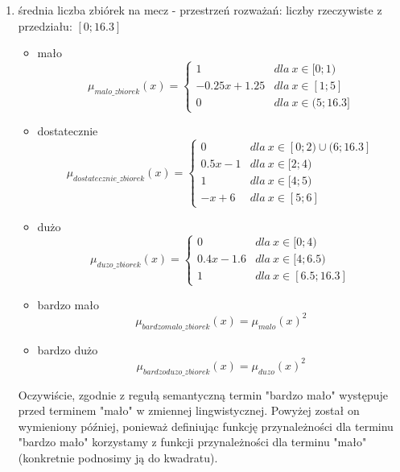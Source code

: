 \documentclass{classrep}
\begin{document}
\begin{enumerate}
    \item średnia liczba zbiórek na mecz - przestrzeń rozważań: liczby rzeczywiste z przedziału: $[0;16.3]$
    \begin{itemize}
        \item mało
        \begin{equation}
            \mu_{malo\_zbiorek}(x) = \left\{\begin{matrix} 1 & dla \: x\in[0;1) \\ -0.25x + 1.25 & dla \: x\in [1; 5] \\ 0 & dla \: x\in (5;16.3] \end{matrix}\right.
        \end{equation}
         \item dostatecznie
        \begin{equation}
            \mu_{dostatecznie\_zbiorek}(x) = \left\{\begin{matrix}0 & dla \: x\in [0;2) \cup (6;16.3] \\ 0.5x - 1 & dla \: x\in[2;4) \\ 1 & dla \: x\in [4; 5) \\ -x + 6 & dla \: x\in [5;6] \end{matrix}\right.
        \end{equation}
        \item dużo
        \begin{equation}
            \mu_{duzo\_zbiorek}(x) = \left\{\begin{matrix} 0 & dla \: x\in [0;4) \\ 0.4x - 1.6 & dla \: x\in[4;6.5) \\ 1 & dla \: x\in [6.5; 16.3] \end{matrix}\right.
        \end{equation}
        \item bardzo mało
        \begin{equation}
            \mu_{bardzomalo\_zbiorek}(x) = \mu_{malo}(x)^2
        \end{equation}
        \item bardzo dużo
        \begin{equation}
            \mu_{bardzoduzo\_zbiorek}(x) = \mu_{duzo}(x)^2
        \end{equation}
    \end{itemize}
    Oczywiście, zgodnie z regułą semantyczną termin "bardzo mało" występuje przed terminem "mało" w zmiennej lingwistycznej. Powyżej został on wymieniony później, ponieważ definiując funkcję przynależności dla terminu "bardzo mało" korzystamy z funkcji przynależności dla terminu "mało" (konkretnie podnosimy ją do kwadratu).

\end{enumerate}
\end{document}
